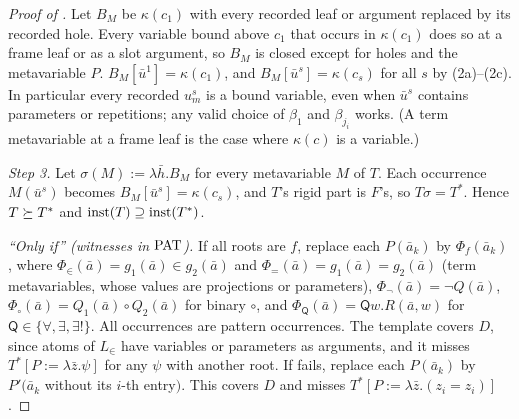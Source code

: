 \begin{proof}[Proof of ]
Let $B_M$ be $\kappa(c_1)$ with every recorded leaf or argument replaced by its recorded hole. Every variable bound above
$c_1$ that occurs in $\kappa(c_1)$ does so at a frame leaf or as a slot argument, so $B_M$ is closed except for holes and
the metavariable $P$. $B_M[\bar u^1]=\kappa(c_1)$, and $B_M[\bar u^s]=\kappa(c_s)$ for all $s$ by (2a)--(2c). In
particular every recorded $u^s_m$ is a bound variable, even when $\bar u^s$ contains parameters or repetitions; any valid
choice of $\beta_1$ and $\beta_{j_i}$ works. (A term metavariable at a frame leaf is the case where $\kappa(c)$ is a
variable.)

\emph{Step 3.} Let $\sigma(M):=\lambda\bar h.B_M$ for every metavariable $M$ of $T$. Each occurrence $M(\bar u^s)$ becomes
$B_M[\bar u^s]=\kappa(c_s)$, and $T$'s rigid part is $F$'s, so $T\sigma=T^*$. Hence $T\succeq T^*$ and
$\mathrm{inst}(T)\supseteq\mathrm{inst}(T^*)$.

\emph{``Only if'' (witnesses in $\mathrm{PAT}$).} If all roots are $f$, replace each $P(\bar a_k)$ by $\Phi_f(\bar a_k)$, where
$\Phi_\in(\bar a)=g_1(\bar a)\in g_2(\bar a)$ and $\Phi_=(\bar a)=g_1(\bar a)=g_2(\bar a)$ (term metavariables, whose
values are projections or parameters), $\Phi_\neg(\bar a)=\neg Q(\bar a)$, $\Phi_\circ(\bar a)=Q_1(\bar
a)\circ Q_2(\bar a)$ for binary $\circ$, and $\Phi_{\mathsf Q}(\bar a)=\mathsf Qw.R(\bar a,w)$ for
$\mathsf Q\in\{\forall,\exists,\exists!\}$. All occurrences are pattern occurrences. The template covers $D$, since atoms
of $L_\in$ have variables or parameters as arguments, and it misses $T^*[P:=\lambda\bar z.\psi]$ for any $\psi$ with
another root. If  fails, replace each $P(\bar a_k)$ by $P'(\bar a_k$ without its $i$-th entry$)$. This covers $D$
and misses $T^*[P:=\lambda\bar z.(z_i=z_i)]$.
\end{proof}

